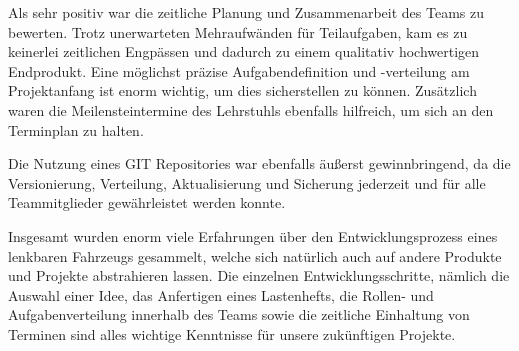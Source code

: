 Als sehr positiv war die zeitliche Planung und Zusammenarbeit des Teams zu bewerten. Trotz unerwarteten Mehraufwänden für Teilaufgaben, kam es zu keinerlei zeitlichen Engpässen und dadurch zu einem qualitativ hochwertigen Endprodukt. Eine möglichst präzise Aufgabendefinition und -verteilung am Projektanfang ist enorm wichtig, um dies sicherstellen zu können. Zusätzlich waren die Meilensteintermine des Lehrstuhls ebenfalls hilfreich, um sich an den Terminplan zu halten.

Die Nutzung eines GIT Repositories war ebenfalls äußerst gewinnbringend, da die Versionierung, Verteilung, Aktualisierung und Sicherung jederzeit und für alle Teammitglieder gewährleistet werden konnte. 

Insgesamt wurden enorm viele Erfahrungen über den Entwicklungsprozess eines lenkbaren Fahrzeugs gesammelt, welche sich natürlich auch auf andere Produkte und Projekte abstrahieren lassen. Die einzelnen Entwicklungsschritte, nämlich die Auswahl einer Idee, das Anfertigen eines Lastenhefts, die Rollen- und Aufgabenverteilung innerhalb des Teams sowie die zeitliche Einhaltung von Terminen sind alles wichtige Kenntnisse für unsere zukünftigen Projekte.
